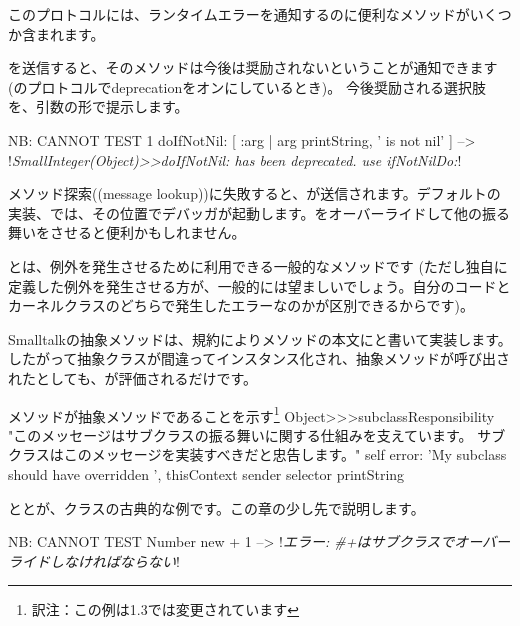 \documentclass[a4paper,10pt,twoside]{book}
\begin{document}
このプロトコルには、ランタイムエラーを通知するのに便利なメソッドがいくつか含まれます。

を送信すると、そのメソッドは今後は奨励されないということが通知できます(のプロトコルでdeprecationをオンにしているとき)。
今後奨励される選択肢を、引数の形で提示します。

\begin{code}{NB: CANNOT TEST}
1 doIfNotNil: [ :arg | arg printString, ' is not nil' ]
  --> !\emph{SmallInteger(Object)>>doIfNotNil: has been deprecated. use ifNotNilDo:}!
\end{code}

メソッド探索((message lookup))に失敗すると、が送信されます。デフォルトの実装、\ie{}では、その位置でデバッガが起動します。をオーバーライドして他の振る舞いをさせると便利かもしれません。


とは、例外を発生させるために利用できる一般的なメソッドです
(ただし独自に定義した例外を発生させる方が、一般的には望ましいでしょう。自分のコードとカーネルクラスのどちらで発生したエラーなのかが区別できるからです)。

Smalltalkの抽象メソッドは、規約によりメソッドの本文にと書いて実装します。したがって抽象クラスが間違ってインスタンス化され、抽象メソッドが呼び出されたとしても、が評価されるだけです。

\begin{method}{メソッドが抽象メソッドであることを示す\protect\footnote{訳注：この例は\pharo 1.3では変更されています}}
Object>>>subclassResponsibility
    "このメッセージはサブクラスの振る舞いに関する仕組みを支えています。
    サブクラスはこのメッセージを実装すべきだと忠告します。"
    self error: 'My subclass should have overridden ', thisContext sender selector printString
\end{method}

ととが、クラスの古典的な例です。この章の少し先で説明します。

\begin{code}{NB: CANNOT TEST}
Number new + 1 --> !\emph{エラー: \#+はサブクラスでオーバーライドしなければならない}!
\end{code}
\end{document}
